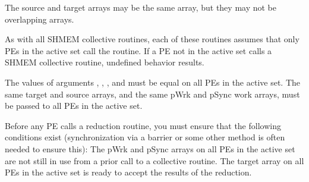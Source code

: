 {{{ The source and target arrays may be the same array, but they may not be
 overlapping arrays.

 As with all SHMEM collective routines, each of these routines assumes
 that only \ac{PE}s in the active set call the routine. If a \ac{PE} not in the
 active set calls a SHMEM collective	 routine, undefined behavior
 results.

 
 The values of arguments , , , and 
 must be equal on all \ac{PE}s in the active set. The same target and source
 arrays, and the same pWrk and pSync work arrays, must be passed to all
 \ac{PE}s in the active set.

 Before any \ac{PE}	calls a reduction routine, you must ensure that the
 following conditions exist (synchronization via a barrier or some other
 method is often needed to ensure this): The pWrk and pSync arrays on
 all \ac{PE}s in the active set are not still in use from a prior call	 to a
 collective \openshmem routine. The target array on all \ac{PE}s in the active
 set is ready to accept the results of the reduction.

}}}
